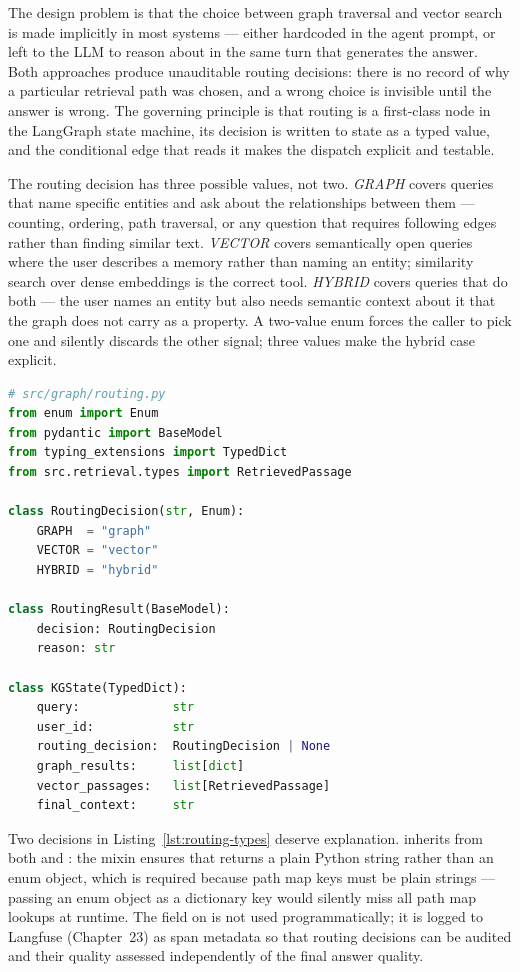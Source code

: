 The design problem is that the choice between graph traversal and vector
search is made implicitly in most systems --- either hardcoded in the
agent prompt, or left to the LLM to reason about in the same turn that
generates the answer. Both approaches produce unauditable routing
decisions: there is no record of why a particular retrieval path was
chosen, and a wrong choice is invisible until the answer is wrong. The
governing principle is that routing is a first-class node in the
LangGraph state machine, its decision is written to state as a typed
value, and the conditional edge that reads it makes the dispatch
explicit and testable.

The routing decision has three possible values, not two.
\emph{GRAPH} covers queries that name specific entities and ask about
the relationships between them --- counting, ordering, path traversal, or
any question that requires following edges rather than finding similar
text. \emph{VECTOR} covers semantically open queries where the user
describes a memory rather than naming an entity; similarity search over
dense embeddings is the correct tool. \emph{HYBRID} covers queries that
do both --- the user names an entity but also needs semantic context about
it that the graph does not carry as a property. A two-value enum forces
the caller to pick one and silently discards the other signal; three
values make the hybrid case explicit.

\begin{lstlisting}[language=Python,
  caption={RoutingDecision enum, RoutingResult model, and KGState},
  label={lst:routing-types}]
# src/graph/routing.py
from enum import Enum
from pydantic import BaseModel
from typing_extensions import TypedDict
from src.retrieval.types import RetrievedPassage

class RoutingDecision(str, Enum):
    GRAPH  = "graph"
    VECTOR = "vector"
    HYBRID = "hybrid"

class RoutingResult(BaseModel):
    decision: RoutingDecision
    reason: str

class KGState(TypedDict):
    query:             str
    user_id:           str
    routing_decision:  RoutingDecision | None
    graph_results:     list[dict]
    vector_passages:   list[RetrievedPassage]
    final_context:     str
\end{lstlisting}

Two decisions in Listing~\ref{lst:routing-types} deserve explanation.
 inherits from both  and
: the  mixin ensures that
 returns a plain Python string rather than
an enum object, which is required because 
path map keys must be plain strings --- passing an enum object as a
dictionary key would silently miss all path map lookups at runtime.
The  field on  is not used
programmatically; it is logged to Langfuse (Chapter~23) as span metadata
so that routing decisions can be audited and their quality assessed
independently of the final answer quality.

